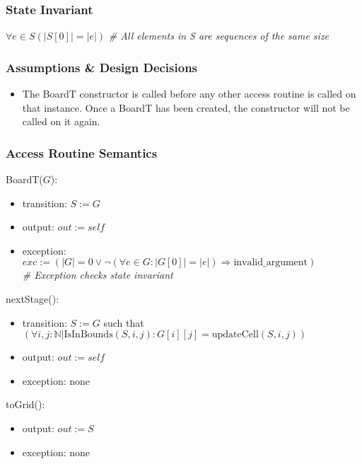 \documentclass[12pt]{article}
\begin{document}
\subsubsection* {State Invariant}

$\forall e \in S (|S[0]| = |e|)$ \textit{\# All elements in S are sequences of the same size}

\subsubsection* {Assumptions \& Design Decisions}

\begin{itemize}

\item The BoardT constructor is called before any other access
  routine is called on that instance. Once a BoardT has been created, the
  constructor will not be called on it again.

\end{itemize}

\newpage


\subsubsection* {Access Routine Semantics}

\noindent BoardT($\mathit{G}$):
\begin{itemize}
\item transition: $S := G$
\item output: $out := self$
\item exception: $exc := (|G| = 0 \lor \lnot(\forall e \in G : |G[0]| = |e|) \Rightarrow \text{invalid\_argument})$
  \\ \textit{\# Exception checks state invariant}
\end{itemize}

\noindent nextStage():
\begin{itemize}
\item transition:
$S:= G$ such that $(\forall i, j: \mathbb{N} | \text{IsInBounds}(S, i, j) : G[i][j] = \text{updateCell}(S, i, j))$
\item output: $out := self$
\item exception: none
\end{itemize}

\noindent toGrid():
\begin{itemize}
\item output: $out := S$
\item exception: none
\end{itemize}
\end{document}
